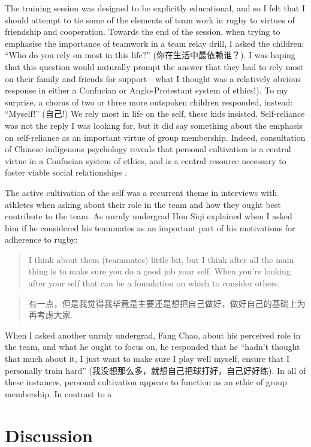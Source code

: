 \begin{CJK}{UTF8}{gbsn}
The training session was designed to be explicitly educational, and so I felt that I should attempt to tie some of the elements of team work in rugby to virtues of friendship and cooperation.  Towards the end of the session, when trying to emphasise the importance of teamwork in a team relay drill, I asked the children: ``Who do you rely on most in this life?'' (你在生活中最依赖谁？).  I was hoping that this question would naturally prompt the answer that they had to rely most on their family and friends for support---what I thought was a relatively obvious response in either a Confucian or Anglo-Protestant system of ethics!).  To my surprise, a chorus of two or three more outspoken children responded, instead: ``Myself!'' (自己!) We rely most in life on the self, these kids insisted. Self-reliance was not the reply I was looking for, but it did say something about the emphasis on self-reliance as an important virtue of group membership.  Indeed, consultation of Chinese indigenous psychology reveals that personal cultivation is a central virtue in a Confucian system of ethics, and is a central resource necessary to foster viable social relationships \citep{Liu2014}.

The active cultivation of the self was a recurrent theme in interviews with athletes when asking about their role in the team and how they ought best contribute to the team.  As unruly undergrad Hou Siqi explained when I asked him if he considered his teammates as an important part of his motivations for adherence to rugby:
   \begin{quote}
       I think about them (teammates) little bit, but I think after all the main thing is to make sure you do a good job your self.  When you're looking after your self that can be a foundation on which to consider others.
   \end{quote}
   \begin{quote}
         有一点，但是我觉得我毕竟是主要还是想把自己做好，做好自己的基础上为再考虑大家.
   \end{quote}

When I asked another unruly undergrad, Fang Chao, about his perceived role in the team, and what he ought to focus on, he responded that he ``hadn't thought that much about it, I just want to make sure I play well myself, ensure that I personally train hard'' (我没想那么多，就想自己把球打好，自己好好练).
In all of these instances, personal cultivation appears to function as an ethic of group membership.
In contrast to a

\section{Discussion}



\end{CJK}
